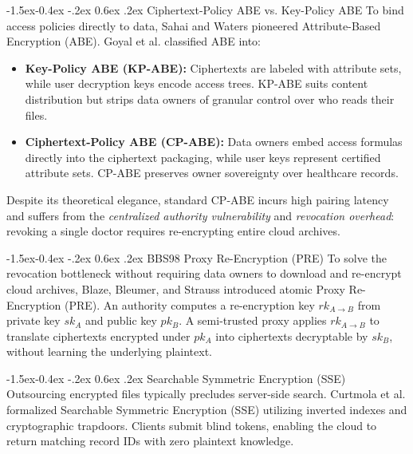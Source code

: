 \documentclass[10pt,twocolumn]{article}
\makeatletter
\renewcommand\subsection{\@startsection{subsection}{2}{\z@}%
  {-1.5ex\@plus -0.4ex \@minus -.2ex}%
  {0.6ex \@plus .2ex}%
  {\normalfont\normalsize\bfseries\itshape\color{accent}}}
\makeatother
\begin{document}
\subsection{Ciphertext-Policy ABE vs. Key-Policy ABE}
To bind access policies directly to data, Sahai and Waters pioneered Attribute-Based Encryption (ABE). Goyal et al. \cite{goyal2006attribute} classified ABE into:
\begin{itemize}
    \item \textbf{Key-Policy ABE (KP-ABE):} Ciphertexts are labeled with attribute sets, while user decryption keys encode access trees. KP-ABE suits content distribution but strips data owners of granular control over who reads their files.
    \item \textbf{Ciphertext-Policy ABE (CP-ABE):} Data owners embed access formulas directly into the ciphertext packaging, while user keys represent certified attribute sets. CP-ABE preserves owner sovereignty over healthcare records.
\end{itemize}
Despite its theoretical elegance, standard CP-ABE incurs high pairing latency and suffers from the \textit{centralized authority vulnerability} and \textit{revocation overhead}: revoking a single doctor requires re-encrypting entire cloud archives.

\subsection{BBS98 Proxy Re-Encryption (PRE)}
To solve the revocation bottleneck without requiring data owners to download and re-encrypt cloud archives, Blaze, Bleumer, and Strauss \cite{blaze1998divertible} introduced atomic Proxy Re-Encryption (PRE). An authority computes a re-encryption key $rk_{A \to B}$ from private key $sk_A$ and public key $pk_B$. A semi-trusted proxy applies $rk_{A \to B}$ to translate ciphertexts encrypted under $pk_A$ into ciphertexts decryptable by $sk_B$, without learning the underlying plaintext.

\subsection{Searchable Symmetric Encryption (SSE)}
Outsourcing encrypted files typically precludes server-side search. Curtmola et al. \cite{curtmola2006searchable} formalized Searchable Symmetric Encryption (SSE) utilizing inverted indexes and cryptographic trapdoors. Clients submit blind tokens, enabling the cloud to return matching record IDs with zero plaintext knowledge.
\end{document}

